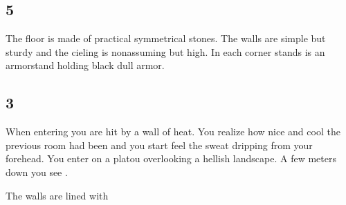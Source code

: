 \subsection*{5}
The floor is made of practical symmetrical stones. The walls are simple but sturdy and the cieling is nonassuming but high. In each corner stands is an armorstand holding black dull armor.

\subsection*{3}
When entering you are hit by a wall of heat. You realize how nice and cool the previous room had been and you start feel the sweat dripping from your forehead. You enter on a platou overlooking a hellish landscape. A few meters down you see .

The walls are lined with 